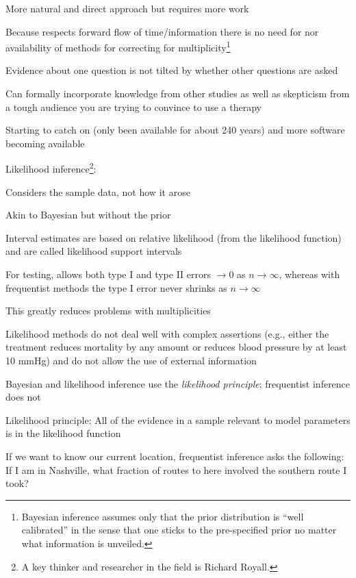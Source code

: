  \item More natural and direct approach but requires more work
 \item Because respects forward flow of time/information there is no
   need for nor availability of methods for correcting for
   multiplicity\footnote{Bayesian inference assumes only that the
     prior distribution is ``well calibrated'' in the sense that one
     sticks to the pre-specified prior no matter what information is unveiled.}
 \item Evidence about one question is not tilted by whether other
   questions are asked
 \item Can formally incorporate knowledge from other studies as well
   as skepticism from a tough audience you are trying to convince to
   use a therapy
 \item Starting to catch on (only been available for about 240 years)
   and more software becoming available
 \ei
\item Likelihood inference\footnote{A key thinker and researcher in the field is Richard Royall.}:
  \bi
  \item Considers the sample data, not how it arose
  \item Akin to Bayesian but without the prior
  \item Interval estimates are based on relative likelihood (from the
    likelihood function) and are called likelihood support intervals
  \item For testing, allows both type I and type II errors
    $\rightarrow 0$ as $n \rightarrow \infty$, whereas with
    frequentist methods the type I error never shrinks as $n
    \rightarrow \infty$
  \item This greatly reduces problems with multiplicities
  \item Likelihood methods do not deal well with complex assertions
    (e.g., either the treatment reduces mortality by any amount or
    reduces blood pressure by at least 10 mmHg) and do not allow the
    use of external information
  \ei
\item Bayesian and likelihood inference use the \emph{likelihood
    principle}; frequentist inference does not 
 \bi
 \item Likelihood principle: All of the evidence in a sample relevant
   to model parameters is in the likelihood function 
 \item If we want to know our current location, frequentist inference
   asks the following: If I am in Nashville, what fraction of routes
   to here involved the southern route I took? 
